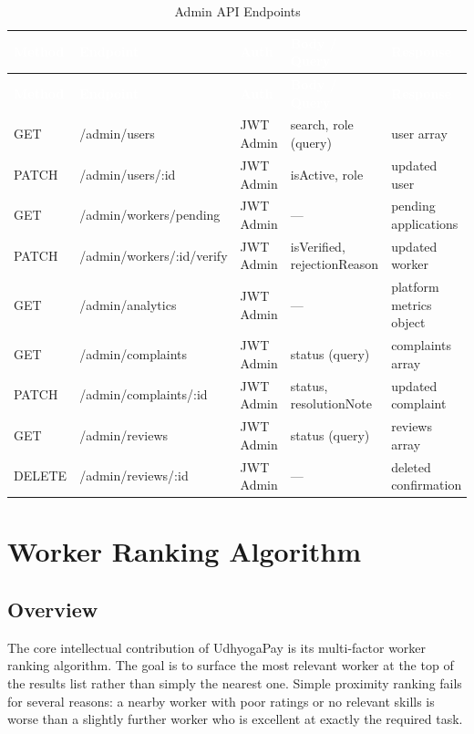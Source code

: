 \documentclass[12pt,a4paper]{report}
\newcommand{\thead}[1]{\cellcolor{tableheader}\textcolor{white}{\textbf{#1}}}
\begin{document}
\begin{longtable}{|p{1cm}|p{3.5cm}|p{1.5cm}|p{3.5cm}|p{3cm}|}
\caption{Admin API Endpoints}\label{tab:adminapi}\\
\hline
\thead{Method} & \thead{Endpoint} & \thead{Auth} & \thead{Body / Query} & \thead{Response} \\
\hline
\endfirsthead
\hline
\thead{Method} & \thead{Endpoint} & \thead{Auth} & \thead{Body / Query} & \thead{Response} \\
\hline
\endhead
GET & /admin/users & JWT Admin & search, role (query) & user array \\
\hline
PATCH & /admin/users/:id & JWT Admin & isActive, role & updated user \\
\hline
GET & /admin/workers/pending & JWT Admin & — & pending applications \\
\hline
PATCH & /admin/workers/:id/verify & JWT Admin & isVerified, rejectionReason & updated worker \\
\hline
GET & /admin/analytics & JWT Admin & — & platform metrics object \\
\hline
GET & /admin/complaints & JWT Admin & status (query) & complaints array \\
\hline
PATCH & /admin/complaints/:id & JWT Admin & status, resolutionNote & updated complaint \\
\hline
GET & /admin/reviews & JWT Admin & status (query) & reviews array \\
\hline
DELETE & /admin/reviews/:id & JWT Admin & — & deleted confirmation \\
\hline
\end{longtable}

\chapter{Worker Ranking Algorithm}

\section{Overview}

The core intellectual contribution of UdhyogaPay is its multi-factor worker ranking algorithm. The goal is to surface the most relevant worker at the top of the results list rather than simply the nearest one. Simple proximity ranking fails for several reasons: a nearby worker with poor ratings or no relevant skills is worse than a slightly further worker who is excellent at exactly the required task.
\end{document}
